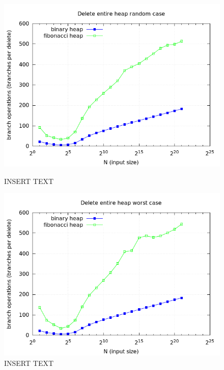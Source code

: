\documentclass[a4paper,oneside,article,11pt]{memoir}
\begin{document}
\begin{figure}[H]
\centering
\begin{minipage}{0.48\columnwidth}
  \centering
  \includegraphics[width=\linewidth]{../res/delmin/delmin_del_all_branch_random.png}%
  \caption{INSERT TEXT}
  \label{fig:delmin_all_random_branch}
\end{minipage}%
\hfill
\begin{minipage}{0.48\columnwidth}
  \centering
  \includegraphics[width=\linewidth]{../res/delmin/delmin_del_all_branch_worst.png}%
  \caption{INSERT TEXT}
  \label{fig:delmin_all_worst_branch}
\end{minipage}
\end{figure}
\end{document}
